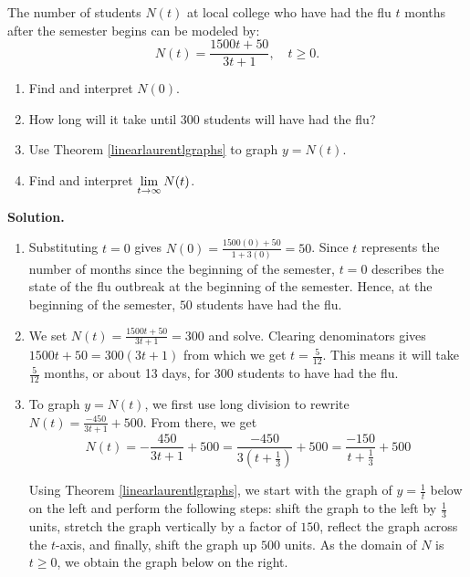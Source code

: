 \begin{ex}  \label{fluex} The number of students $N(t)$ at local college who have had the flu $t$ months after the semester begins can be modeled by: \[ N(t) = \dfrac{1500t + 50}{3t+1},  \quad t \geq 0.\]

\begin{enumerate}

\item  Find and interpret $N(0)$.

\item  How long will it take until $300$ students will have had the flu?

\item  Use Theorem \ref{linearlaurentlgraphs} to graph $y = N(t)$.  

\item  Find and interpret $\ds{\lim_{t \rightarrow \infty} N(t)}$.

\end{enumerate}

{ \bf Solution.}

\begin{enumerate}

\item  Substituting $t=0$ gives $N(0) = \frac{1500(0) + 50}{1+3(0)} = 50$.  Since $t$ represents the number of months since the beginning of the semester, $t=0$ describes the state of the flu outbreak at the beginning of the semester. Hence,  at the beginning of the semester, $50$ students have had the flu.

\item  We set $N(t) = \frac{1500t + 50}{3t+1}  = 300$ and solve.  Clearing denominators gives $1500t + 50 = 300(3t+1)$ from which we get $t = \frac{5}{12}$.  This means it will take $\frac{5}{12}$ months, or about 13 days, for $300$ students to have had the flu.

\item To graph $y = N(t)$, we first use long division to rewrite $N(t) = \frac{-450}{3t+1} + 500$.  From there, we get  \[N(t) =  -\frac{450}{3t+1} + 500  = \frac{-450}{3\left(t + \frac{1}{3}\right)} + 500 = \frac{-150}{t+\frac{1}{3}} + 500\]

Using Theorem \ref{linearlaurentlgraphs}, we start with the graph of $y = \frac{1}{t}$ below on the left and perform the following steps: shift the graph to the left by $\frac{1}{3}$ units, stretch the graph vertically by a factor of $150$, reflect the graph across the $t$-axis, and finally, shift the graph up $500$ units.   As the domain of $N$ is $t \geq 0$, we obtain the graph below on the right.


\end{enumerate}
\end{ex}

